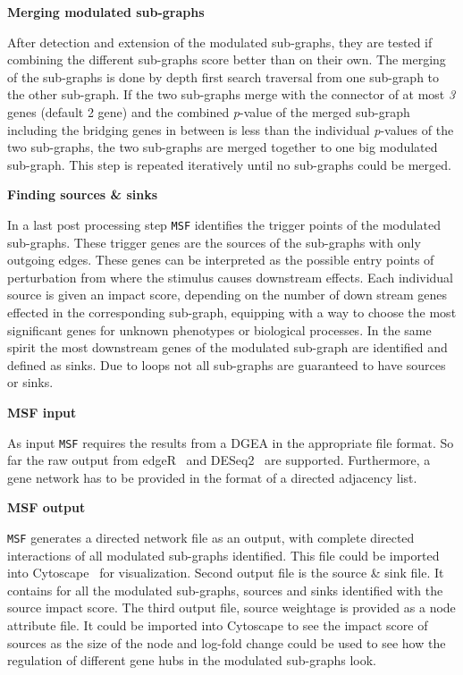 \documentclass[10pt,a4paper,twocolumn]{article}
\begin{document}
\textbf{Merging modulated sub-graphs}

After detection and extension of the modulated sub-graphs, they are tested
if combining the different sub-graphs score better than on their own. The merging of the sub-graphs is done by depth first search traversal from one sub-graph to the other sub-graph. If the two sub-graphs merge
with the connector of at most \emph{3} genes (default 2 gene) and the
combined \textit{p}-value of the merged sub-graph including the bridging
genes in between is less than the individual \textit{p}-values of the two
sub-graphs, the two sub-graphs are merged together to one big modulated
sub-graph. This step is repeated iteratively until no sub-graphs could be
merged.\newline

\textbf{Finding sources \& sinks}

In a last post processing step \texttt{MSF} identifies the trigger points
of the modulated sub-graphs. These trigger genes are the sources of the
sub-graphs with only outgoing edges. These genes can be interpreted as the
possible entry points of perturbation from where the stimulus causes
downstream effects. Each individual source is given an impact score, depending on the number of down stream genes effected in the corresponding sub-graph, equipping with a way to choose the most significant genes for unknown phenotypes or biological processes. In the same spirit the most downstream genes of the
modulated sub-graph are identified and defined as sinks. Due to loops not all
sub-graphs are guaranteed to have sources or sinks.

\textbf{MSF input}

As input \texttt{MSF} requires the results from
a DGEA in the appropriate file format. So
far the raw output from edgeR~\cite{edgeR} and
DESeq2~\cite{love2014moderated} are supported. Furthermore, a gene network
has to be provided in the format of a directed adjacency list.

\textbf{MSF output}

\texttt{MSF} generates a directed network file as an output, with complete directed interactions of all modulated sub-graphs identified. This file could be imported into Cytoscape~\cite{Cyto} for visualization. Second output file is the source \& sink file. It contains for all the modulated sub-graphs, sources and sinks identified with the source impact score. The third output file, source weightage is provided as a node attribute file. It could be imported into Cytoscape to see the impact score of sources as the size of the node and log-fold change could be used to see how the regulation of different gene hubs in the modulated sub-graphs look.
	
\end{document}
